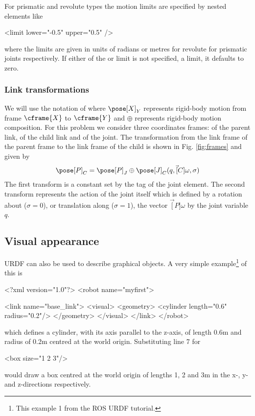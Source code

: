 \documentclass[9pt,fleqn,a4paper]{article}
\begin{document}
For prismatic and revolute types the motion limits are specified by nested
elements like
\begin{XML}
<limit lower="-0.5" upper="0.5" />
\end{XML}
where the limits are given in units of radians or metres for revolute for prismatic joints respectively.  If either of the
 or  limit is not specified, a limit, it defaults to zero.


\subsubsection{Link transformations}
We will use the notation of \cite{Corke17a} where $\pose[X]_Y$ represents rigid-body motion from frame $\cframe{X}$ to $\cframe{Y}$ and 
$\oplus$ represents rigid-body motion composition.  
For this problem we consider three coordinates frames:  of the parent link,  of the child link and  of the 
joint.
The transformation from the link frame of the parent frame to the link frame of the child is shown in Fig. \ref{fig:frames} and given by
\[
\pose[P]_C = \pose[P]_J \oplus \pose[J]_C(q, \vec[C]{\omega}, \sigma)
\]
The first transform is a constant set by the tag of the joint element.
The second transform represents the action of the joint itself which is defined by a rotation about ($\sigma=0$), or translation along ($\sigma=1$), the vector $\vec[P]{\omega}$ by the joint variable $q$.

\subsection{Visual appearance}
URDF can also be used to describe graphical objects.  A very simple example\footnote{This example 1 from the ROS URDF tutorial.} of this is

\begin{XMLNum}
<?xml version="1.0"?>
<robot name="myfirst">

  <link name="base_link">
    <visual>
      <geometry>
        <cylinder length="0.6" radius="0.2"/>
      </geometry>
    </visual>
  </link>
</robot>
\end{XMLNum}
which defines a cylinder, with its axis parallel to the z-axis,  of length 0.6\unit{m} and radius of 0.2\unit{m} centred at the world origin. 
Substituting line 7 for
\begin{XML}
        <box size="1 2 3"/>
\end{XML}
would draw a box centred at the world origin of lengths 1, 2 and 3\unit{m} in the x-, y- and z-directions respectively.
\end{document}
